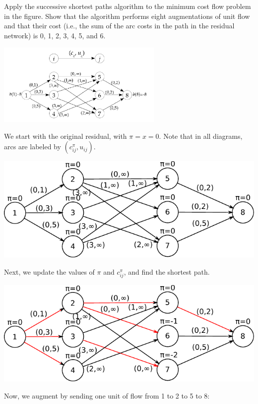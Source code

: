 \documentclass[fleqn]{homework}
\begin{document}
  \begin{problem}{5}
    \begin{question}
      Apply the successive shortest paths algorithm to the minimum cost flow
      problem in the figure. Show that the algorithm performs eight
      augmentations of unit flow and that their cost (i.e., the sum of the arc
      costs in the path in the residual network) is 0, 1, 2, 3, 4, 5, and 6.

      \includegraphics[width=0.6\textwidth]{p5-fig.png}
    \end{question}

    We start with the original residual, with $\pi=x=0$.  Note that in all
    diagrams, arcs are labeled by $(c_{ij}^\pi, u_{ij})$.

    \includegraphics{p5-00-initial.pdf}

    Next, we update the values of $\pi$ and $c_{ij}^\pi$, and find the shortest
    path.

    \includegraphics{p5-01-update-pi.pdf}

    Now, we augment by sending one unit of flow from 1 to 2 to 5 to 8:


\end{problem}
\end{document}
